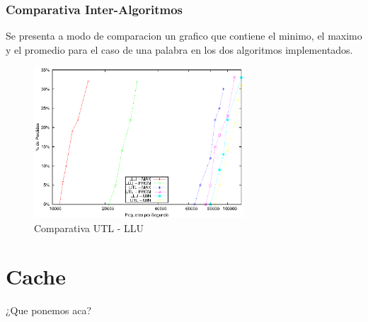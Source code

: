 \newpage
\subsubsection{Comparativa Inter-Algoritmos}
Se presenta a modo de comparacion un grafico que contiene el minimo, el maximo y el promedio para el caso de una palabra en los dos algoritmos implementados. 
\begin{figure}[!h]
  \centering
	\includegraphics[width=0.7\textwidth]{5-resultados/graf/lluvsutl.eps}
  \caption{Comparativa UTL - LLU}
  \label{figvs}
\end{figure}


\newpage
\section{Cache}
 
¿Que ponemos aca?

